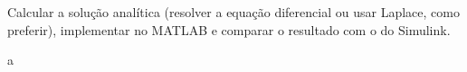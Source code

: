 \documentclass{article}
\begin{document}
            \begin{exercise}
                Calcular a solução analítica (resolver a equação diferencial ou usar Laplace, como preferir), implementar no MATLAB e comparar o resultado com o do Simulink.
            \end{exercise}
            \begin{resolution}
                a
            \end{resolution}
\end{document}
